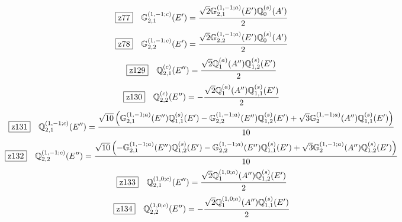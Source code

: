 \documentclass[fleqn,10pt,landscape]{jsarticle}
\begin{document}
\begin{dmath*}
\hspace*{3mm}\fbox{z77}\quad \mathbb{G}_{2,1}^{(1,-1;c)}(E^{\prime})=\frac{\sqrt{2} \mathbb{G}_{2,1}^{(1,-1;a)}(E^{\prime}) \mathbb{Q}_{0}^{(s)}(A^{\prime})}{2}
\end{dmath*}
\begin{dmath*}
\hspace*{3mm}\fbox{z78}\quad \mathbb{G}_{2,2}^{(1,-1;c)}(E^{\prime})=\frac{\sqrt{2} \mathbb{G}_{2,2}^{(1,-1;a)}(E^{\prime}) \mathbb{Q}_{0}^{(s)}(A^{\prime})}{2}
\end{dmath*}
\begin{dmath*}
\hspace*{3mm}\fbox{z129}\quad \mathbb{Q}_{2,1}^{(c)}(E^{\prime\prime})=\frac{\sqrt{2} \mathbb{Q}_{1}^{(a)}(A^{\prime\prime}) \mathbb{Q}_{1,2}^{(s)}(E^{\prime})}{2}
\end{dmath*}
\begin{dmath*}
\hspace*{3mm}\fbox{z130}\quad \mathbb{Q}_{2,2}^{(c)}(E^{\prime\prime})=- \frac{\sqrt{2} \mathbb{Q}_{1}^{(a)}(A^{\prime\prime}) \mathbb{Q}_{1,1}^{(s)}(E^{\prime})}{2}
\end{dmath*}
\begin{dmath*}
\hspace*{3mm}\fbox{z131}\quad \mathbb{Q}_{2,1}^{(1,-1;c)}(E^{\prime\prime})=\frac{\sqrt{10} \left(\mathbb{G}_{2,1}^{(1,-1;a)}(E^{\prime\prime}) \mathbb{Q}_{1,1}^{(s)}(E^{\prime}) - \mathbb{G}_{2,2}^{(1,-1;a)}(E^{\prime\prime}) \mathbb{Q}_{1,2}^{(s)}(E^{\prime}) + \sqrt{3} \mathbb{G}_{2}^{(1,-1;a)}(A^{\prime\prime}) \mathbb{Q}_{1,1}^{(s)}(E^{\prime})\right)}{10}
\end{dmath*}
\begin{dmath*}
\hspace*{3mm}\fbox{z132}\quad \mathbb{Q}_{2,2}^{(1,-1;c)}(E^{\prime\prime})=\frac{\sqrt{10} \left(- \mathbb{G}_{2,1}^{(1,-1;a)}(E^{\prime\prime}) \mathbb{Q}_{1,2}^{(s)}(E^{\prime}) - \mathbb{G}_{2,2}^{(1,-1;a)}(E^{\prime\prime}) \mathbb{Q}_{1,1}^{(s)}(E^{\prime}) + \sqrt{3} \mathbb{G}_{2}^{(1,-1;a)}(A^{\prime\prime}) \mathbb{Q}_{1,2}^{(s)}(E^{\prime})\right)}{10}
\end{dmath*}
\begin{dmath*}
\hspace*{3mm}\fbox{z133}\quad \mathbb{Q}_{2,1}^{(1,0;c)}(E^{\prime\prime})=\frac{\sqrt{2} \mathbb{Q}_{1}^{(1,0;a)}(A^{\prime\prime}) \mathbb{Q}_{1,2}^{(s)}(E^{\prime})}{2}
\end{dmath*}
\begin{dmath*}
\hspace*{3mm}\fbox{z134}\quad \mathbb{Q}_{2,2}^{(1,0;c)}(E^{\prime\prime})=- \frac{\sqrt{2} \mathbb{Q}_{1}^{(1,0;a)}(A^{\prime\prime}) \mathbb{Q}_{1,1}^{(s)}(E^{\prime})}{2}
\end{dmath*}
\end{document}
